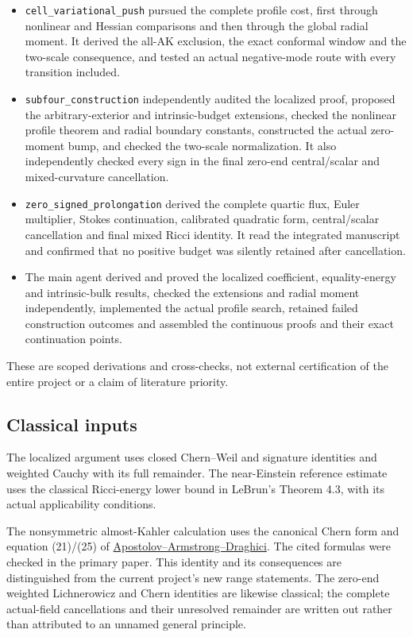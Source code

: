 \documentclass[
  10pt,
]{article}
\providecommand{\tightlist}{%
  \setlength{\itemsep}{0pt}\setlength{\parskip}{0pt}}
\begin{document}
\begin{itemize}
\tightlist
\item
  \nolinkurl{cell_variational_push} pursued the complete profile cost,
  first through nonlinear and Hessian comparisons and then through the
  global radial moment. It derived the all-AK exclusion, the exact
  conformal window and the two-scale consequence, and tested an actual
  negative-mode route with every transition included.
\item
  \nolinkurl{subfour_construction} independently audited the localized
  proof, proposed the arbitrary-exterior and intrinsic-budget
  extensions, checked the nonlinear profile theorem and radial boundary
  constants, constructed the actual zero-moment bump, and checked the
  two-scale normalization. It also independently checked every sign in
  the final zero-end central/scalar and mixed-curvature cancellation.
\item
  \nolinkurl{zero_signed_prolongation} derived the complete quartic flux,
  Euler multiplier, Stokes continuation, calibrated quadratic form,
  central/scalar cancellation and final mixed Ricci identity. It read
  the integrated manuscript and confirmed that no positive budget was
  silently retained after cancellation.
\item
  The main agent derived and proved the localized coefficient,
  equality-energy and intrinsic-bulk results, checked the extensions and
  radial moment independently, implemented the actual profile search,
  retained failed construction outcomes and assembled the continuous
  proofs and their exact continuation points.
\end{itemize}

These are scoped derivations and cross-checks, not external
certification of the entire project or a claim of literature priority.

\hypertarget{classical-inputs}{%
\subsection{Classical inputs}\label{classical-inputs}}

The localized argument uses closed Chern--Weil and signature identities
and weighted Cauchy with its full remainder. The near-Einstein reference
estimate uses the classical Ricci-energy lower bound in LeBrun's Theorem
4.3, with its actual applicability conditions.

The nonsymmetric almost-Kahler calculation uses the canonical Chern form
and equation (21)/(25) of
\href{https://faculty.fiu.edu/~draghici/research/paperfiles/Math-Ann.pdf}{Apostolov--Armstrong--Draghici}.
The cited formulas were checked in the primary paper. This identity and
its consequences are distinguished from the current project's new range
statements. The zero-end weighted Lichnerowicz and Chern identities are
likewise classical; the complete actual-field cancellations and their
unresolved remainder are written out rather than attributed to an
unnamed general principle.
\end{document}
